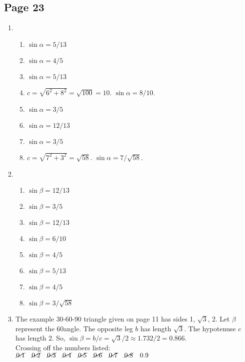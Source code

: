 \documentclass{article}
\newenvironment{solutions}[1]
{\subsection*{#1}
 \begin{enumerate}[leftmargin=1.5em]}
{\end{enumerate}}
\newcommand{\solution}{\item}
\newenvironment{subsolutions}
{\begin{enumerate}}
{\end{enumerate}}
\newcommand{\subsolution}{\item}
\begin{document}
\begin{solutions}{Page 23}
\solution %
\begin{subsolutions}
\subsolution $\sin{\alpha} = 5/13$
\subsolution $\sin{\alpha} = 4/5$
\subsolution $\sin{\alpha} = 5/13$
\subsolution $c = \sqrt{6^2 + 8^2} = \sqrt{100} = 10$. $\sin{\alpha} = 8/10$.
\subsolution $\sin{\alpha} = 3/5$
\subsolution $\sin{\alpha} = 12/13$
\subsolution $\sin{\alpha} = 3/5$
\subsolution $c = \sqrt{7^2 + 3^2} = \sqrt{58}$. $\sin{\alpha} = 7/\sqrt{58}$.
\end{subsolutions}

\solution %
\begin{subsolutions}
\subsolution $\sin{\beta} = 12/13$
\subsolution $\sin{\beta} = 3/5$
\subsolution $\sin{\beta} = 12/13$
\subsolution $\sin{\beta} = 6/10$
\subsolution $\sin{\beta} = 4/5$
\subsolution $\sin{\beta} = 5/13$
\subsolution $\sin{\beta} = 4/5$
\subsolution $\sin{\beta} = 3/\sqrt{58}$
\end{subsolutions}

\solution %
The example 30-60-90 triangle given on page 11 has sides 1, $\sqrt{3}$, 2. Let $\beta$ represent the 60\degree angle.
The opposite leg $b$ has length $\sqrt{3}$. The hypotenuse $c$ has length 2. So, $\sin{\beta} = b/c = \sqrt{3}/2 \approx 1.732/2 = 0.866$.\\
\noindent Crossing off the numbers listed:\\
$\cancel{0.1}\quad\cancel{0.2}\quad\cancel{0.3}\quad\cancel{0.4}\quad\cancel{0.5}\quad\cancel{0.6}\quad\cancel{0.7}\quad\cancel{0.8}\quad0.9$

\end{solutions}
\end{document}
